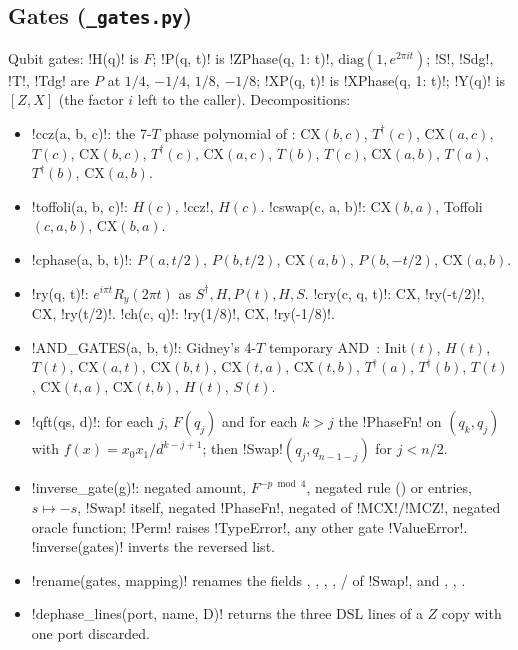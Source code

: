 \subsection{Gates (\texttt{\_gates.py})}

Qubit gates: \py!H(q)! is $F$; \py!P(q, t)! is \py!ZPhase(q, {1: t})!, $\mathrm{diag}(1,
e^{2\pi i t})$; \py!S!, \py!Sdg!, \py!T!, \py!Tdg! are $P$ at $1/4$, $-1/4$, $1/8$, $-1/8$;
\py!XP(q, t)! is \py!XPhase(q, {1: t})!; \py!Y(q)! is $[Z, X]$ (the factor $i$ left to the
caller). Decompositions:
\begin{itemize}
\item \py!ccz(a, b, c)!: the 7-$T$ phase polynomial of \citet[Fig.~4.9]{nielsen2010quantum}:
  CX$(b,c)$, $T^\dagger(c)$, CX$(a,c)$, $T(c)$, CX$(b,c)$, $T^\dagger(c)$, CX$(a,c)$, $T(b)$,
  $T(c)$, CX$(a,b)$, $T(a)$, $T^\dagger(b)$, CX$(a,b)$.
\item \py!toffoli(a, b, c)!: $H(c)$, \py!ccz!, $H(c)$. \py!cswap(c, a, b)!: CX$(b,a)$,
  Toffoli$(c,a,b)$, CX$(b,a)$.
\item \py!cphase(a, b, t)!: $P(a, t/2)$, $P(b, t/2)$, CX$(a,b)$, $P(b,-t/2)$, CX$(a,b)$.
\item \py!ry(q, t)!: $e^{i\pi t}R_y(2\pi t)$ as $S^\dagger, H, P(t), H, S$.
  \py!cry(c, q, t)!: CX, \py!ry(-t/2)!, CX, \py!ry(t/2)!. \py!ch(c, q)!: \py!ry(1/8)!, CX,
  \py!ry(-1/8)!.
\item \py!AND_GATES(a, b, t)!: Gidney's 4-$T$ temporary AND~\cite{gidney2018halving}:
  Init$(t)$, $H(t)$, $T(t)$, CX$(a,t)$, CX$(b,t)$, CX$(t,a)$, CX$(t,b)$, $T^\dagger(a)$,
  $T^\dagger(b)$, $T(t)$, CX$(t,a)$, CX$(t,b)$, $H(t)$, $S(t)$.
\item \py!qft(qs, d)!: for each $j$, $F(q_j)$ and for each $k>j$ the \py!PhaseFn! on
  $(q_k, q_j)$ with $f(x) = x_0x_1/d^{k-j+1}$; then \py!Swap!$(q_j, q_{n-1-j})$ for $j<n/2$.
\item \py!inverse_gate(g)!: negated amount, $F^{-p \bmod 4}$, negated rule () or
  entries, $s\mapsto -s$, \py!Swap! itself, negated \py!PhaseFn!, negated  of
  \py!MCX!/\py!MCZ!, negated oracle function; \py!Perm! raises \py!TypeError!, any other gate
  \py!ValueError!. \py!inverse(gates)! inverts the reversed list.
\item \py!rename(gates, mapping)! renames the fields , , , ,
  / of \py!Swap!, and , , .
\item \py!dephase_lines(port, name, D)! returns the three DSL lines of a $Z$ copy with one port
  discarded.
\end{itemize}

